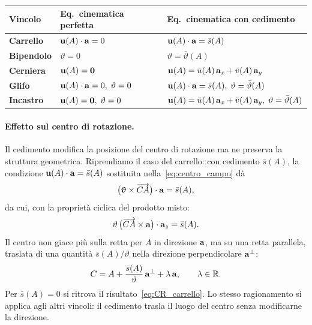 \begin{center}
	\renewcommand{\arraystretch}{1.6}
	\small
	\begin{tabular}{>{\bfseries}lll}
		\toprule
		Vincolo
		& Eq.\ cinematica perfetta
		& Eq.\ cinematica con cedimento\\
		\midrule
		Carrello
		& $\mathbf{u}(A)\cdot\mathbf{a} = 0$
		& $\mathbf{u}(A)\cdot\mathbf{a} = \bar{s}(A)$\\
		Bipendolo
		& $\vartheta = 0$
		& $\vartheta = \bar{\vartheta}(A)$\\
		Cerniera
		& $\mathbf{u}(A) = \mathbf{0}$
		& $\mathbf{u}(A) = \bar{u}(A)\,\mathbf{a}_x
		+ \bar{v}(A)\,\mathbf{a}_y$\\
		Glifo
		& $\mathbf{u}(A)\cdot\mathbf{a} = 0,\;\vartheta=0$
		& $\mathbf{u}(A)\cdot\mathbf{a} = \bar{s}(A),\;
		\vartheta = \bar{\vartheta}(A)$\\
		Incastro
		& $\mathbf{u}(A)=\mathbf{0},\;\vartheta=0$
		& $\mathbf{u}(A) = \bar{u}(A)\,\mathbf{a}_x
		+ \bar{v}(A)\,\mathbf{a}_y,\;
		\vartheta = \bar{\vartheta}(A)$\\
		\bottomrule
	\end{tabular}
\end{center}

\smallskip

\paragraph{Effetto sul centro di rotazione.}
Il cedimento modifica la posizione del centro di rotazione
ma ne preserva la struttura geometrica. Riprendiamo il caso
del carrello: con cedimento $\bar{s}(A)$, la condizione
$\mathbf{u}(A)\cdot\mathbf{a} = \bar{s}(A)$ sostituita
nella~\eqref{eq:centro_campo} dà
\begin{equation}
	\bigl(\bm{\upvartheta}\times\overrightarrow{CA}\bigr)
	\cdot\mathbf{a} = \bar{s}(A),
\end{equation}
da cui, con la proprietà ciclica del prodotto misto:
\begin{equation}
	\vartheta\,\bigl(\overrightarrow{CA}\times\mathbf{a}\bigr)
	\cdot\mathbf{a}_z = \bar{s}(A).
\end{equation}
Il centro non giace più sulla retta per $A$ in direzione
$\mathbf{a}$, ma su una retta parallela, traslata di una quantità
$\bar{s}(A)/\vartheta$ nella direzione perpendicolare
$\mathbf{a}^{\perp}$:
\begin{equation}\label{eq:CR_carrello_cedimento}
	C = A + \frac{\bar{s}(A)}{\vartheta}\,\mathbf{a}^{\perp}
	+ \lambda\,\mathbf{a},
	\qquad \lambda \in \mathbb{R}.
\end{equation}
Per $\bar{s}(A) = 0$ si ritrova il
risultato~\eqref{eq:CR_carrello}. Lo stesso ragionamento
si applica agli altri vincoli: il cedimento trasla il luogo
del centro senza modificarne la direzione.


